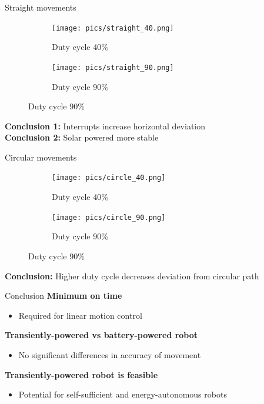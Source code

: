 \documentclass{beamer}
\begin{document}
\begin{frame}{Straight movements}
	\vspace{0.5em}
	\vspace{-0.5em}
	\begin{figure}
		\centering
		\begin{subfigure}[b]{0.28\textwidth}
			\texttt{[image: pics/straight\_40.png]}
			\caption*{Duty cycle 40\%}
		\end{subfigure}
		\hspace{2em}
		\begin{subfigure}[b]{0.28\textwidth}
			\texttt{[image: pics/straight\_90.png]}
			\caption*{Duty cycle 90\%}
		\end{subfigure}
	\end{figure}
	\pause
	\vspace{0.5em}
	\textbf{Conclusion 1:} Interrupts increase horizontal deviation \\
	\textbf{Conclusion 2:} Solar powered more stable \\
\end{frame}

\begin{frame}{Circular movements}
	\vspace{-1em}
	\begin{figure}[h!]
		\centering
		\begin{subfigure}[b]{0.49\textwidth}
			\texttt{[image: pics/circle\_40.png]}
			\caption*{Duty cycle 40\%}
		\end{subfigure}
		\begin{subfigure}[b]{0.49\textwidth}
			\texttt{[image: pics/circle\_90.png]}
			\caption*{Duty cycle 90\%}
		\end{subfigure}
	\end{figure}
	\pause
	\vspace{0.5em}
	\textbf{Conclusion:} Higher duty cycle decreases deviation from circular path
\end{frame}

\begin{frame}{Conclusion}
	\textbf{Minimum on time} \\
	\begin{itemize}
		\item Required for linear motion control
	\end{itemize}
	\vspace{1em}
	\textbf{Transiently-powered vs battery-powered robot} \\
	\begin{itemize}
		\item No significant differences in accuracy of movement
	\end{itemize}
	\vspace{1em}
	\textbf{Transiently-powered robot is feasible} \\
	\begin{itemize}
		\item Potential for self-sufficient and energy-autonomous robots
	\end{itemize}
\end{frame}
\end{document}
